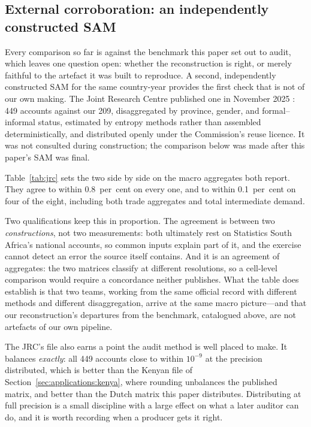 \subsection{External corroboration: an independently constructed SAM}
\label{sec:results:jrc}

Every comparison so far is against the benchmark this paper set out to
audit, which leaves one question open: whether the reconstruction is
right, or merely faithful to the artefact it was built to reproduce.
A second, independently constructed SAM for the same country-year
provides the first check that is not of our own making. The Joint
Research Centre published one in November 2025 \citep{elmeligi2025}: 449
accounts against our 209, disaggregated by province, gender, and
formal--informal status, estimated by entropy methods rather than
assembled deterministically, and distributed openly under the
Commission's reuse licence. It was not consulted during construction;
the comparison below was made after this paper's SAM was final.

Table~\ref{tab:jrc} sets the two side by side on the macro aggregates
both report. They agree to within 0.8~per~cent on every one, and to
within 0.1~per~cent on four of the eight, including both trade
aggregates and total intermediate demand.

\begin{table}[t]
\centering\small
\caption{The 2019 South African SAM of this paper against the
independently constructed SAM of \citet{elmeligi2025}, on the macro
aggregates both report.}
\label{tab:jrc}

\end{table}

Two qualifications keep this in proportion. The agreement is between two
\emph{constructions}, not two measurements: both ultimately rest on
Statistics South Africa's national accounts, so common inputs explain
part of it, and the exercise cannot detect an error the source itself
contains. And it is an agreement of aggregates: the two matrices classify
at different resolutions, so a cell-level comparison would require a
concordance neither publishes. What the table does establish is that two
teams, working from the same official record with different methods and
different disaggregation, arrive at the same macro picture---and that our
reconstruction's departures from the benchmark, catalogued above, are
not artefacts of our own pipeline.

The JRC's file also earns a point the audit method is well placed to
make. It balances \emph{exactly}: all 449 accounts close to within
$10^{-9}$ at the precision distributed, which is better than the Kenyan
file of Section~\ref{sec:applications:kenya}, where rounding unbalances
the published matrix, and better than the Dutch matrix this paper
distributes. Distributing at full precision is a small discipline with a
large effect on what a later auditor can do, and it is worth recording
when a producer gets it right.

